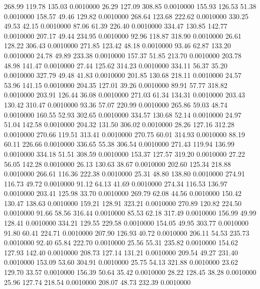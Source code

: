  268.99  119.78  135.03   0.0010000
  26.29  127.09  308.85   0.0010000
 155.93  126.53   51.38   0.0010000
 158.57   49.46  129.82   0.0010000
 268.64  123.68  222.62   0.0010000
 330.25   49.53   42.15   0.0010000
  87.06   61.39  226.40   0.0010000
 334.47  130.85  142.77   0.0010000
 207.17   49.44  234.95   0.0010000
  92.96  118.87  318.90   0.0010000
  26.61  128.22  306.43   0.0010000
 271.85  123.42   48.18   0.0010000
  93.46   62.87  133.20   0.0010000
  24.78   49.89  233.38   0.0010000
 157.37   51.85  213.70   0.0010000
 203.78   48.98  141.47   0.0010000
  27.44  125.62  314.23   0.0010000
 334.11   56.37   35.20   0.0010000
 327.79   49.48   41.83   0.0010000
 201.85  130.68  218.11   0.0010000
  24.57   53.96  141.15   0.0010000
 204.35  127.01   39.26   0.0010000
  89.91   57.77  318.82   0.0010000
 203.91  126.44   36.08   0.0010000
 271.03   61.34  134.31   0.0010000
 203.43  130.42  310.47   0.0010000
  93.36   57.07  220.99   0.0010000
 265.86   59.03   48.74   0.0010000
 160.55   52.93  302.65   0.0010000
 334.57  130.68   52.14   0.0010000
  24.97   51.04  142.58   0.0010000
 204.32  131.50  306.02   0.0010000
  28.26  127.16  312.28   0.0010000
 270.66  119.51  313.41   0.0010000
 270.75   60.01  314.93   0.0010000
  88.19   60.11  226.66   0.0010000
 336.65   55.38  306.54   0.0010000
 271.43  119.94  136.99   0.0010000
 334.18   51.51  308.59   0.0010000
 153.37  127.57  319.20   0.0010000
  27.22   56.05  142.28   0.0010000
  26.13  130.63   38.67   0.0010000
 202.60  125.34  218.88   0.0010000
 266.61  116.36  222.38   0.0010000
  25.31   48.80  138.80   0.0010000
 274.91  116.73   49.72   0.0010000
  91.12   64.13   41.69   0.0010000
 274.34  116.53  136.97   0.0010000
 203.41  125.98   33.70   0.0010000
 269.79   62.08   44.56   0.0010000
 150.42  130.47  138.63   0.0010000
 159.21  128.91  323.21   0.0010000
 270.89  120.82  224.50   0.0010000
  91.66   58.56  316.44   0.0010000
  85.53   62.18  317.49   0.0010000
 156.99   49.99  128.41   0.0010000
 334.21  129.55  229.58   0.0010000
 154.05   49.95  303.77   0.0010000
  91.80   60.41  224.71   0.0010000
 207.90  126.93   40.72   0.0010000
 206.11   54.53  235.73   0.0010000
  92.40   65.84  222.70   0.0010000
  25.56   55.31  235.82   0.0010000
 154.62  127.93  142.40   0.0010000
 208.73  127.14  131.21   0.0010000
 209.54   49.27  231.40   0.0010000
 153.09   53.60  304.91   0.0010000
  25.75   54.13  321.88   0.0010000
  23.62  129.70   33.57   0.0010000
 156.39   50.64   35.42   0.0010000
  28.22  128.45   38.28   0.0010000
  25.96  127.74  218.54   0.0010000
 208.07   48.73  232.39   0.0010000
